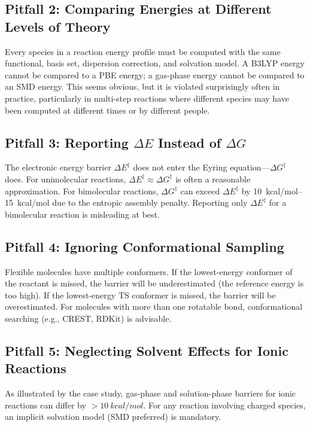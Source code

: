\documentclass[11pt]{article}
\numberwithin{equation}{section}
\begin{document}
\subsection{Pitfall 2: Comparing Energies at Different Levels of Theory}

Every species in a reaction energy profile must be computed with the same functional, basis set, dispersion correction, and solvation model. A B3LYP energy cannot be compared to a PBE energy; a gas-phase energy cannot be compared to an SMD energy. This seems obvious, but it is violated surprisingly often in practice, particularly in multi-step reactions where different species may have been computed at different times or by different people.

\subsection{Pitfall 3: Reporting $\Delta E$ Instead of $\Delta G$}

The electronic energy barrier $\Delta E^\ddagger$ does not enter the Eyring equation---$\Delta G^\ddagger$ does. For unimolecular reactions, $\Delta E^\ddagger \approx \Delta G^\ddagger$ is often a reasonable approximation. For bimolecular reactions, $\Delta G^\ddagger$ can exceed $\Delta E^\ddagger$ by \SIrange{10}{15}{kcal/mol} due to the entropic assembly penalty. Reporting only $\Delta E^\ddagger$ for a bimolecular reaction is misleading at best.

\subsection{Pitfall 4: Ignoring Conformational Sampling}

Flexible molecules have multiple conformers. If the lowest-energy conformer of the reactant is missed, the barrier will be underestimated (the reference energy is too high). If the lowest-energy TS conformer is missed, the barrier will be overestimated. For molecules with more than one rotatable bond, conformational searching (e.g., CREST, RDKit) is advisable.

\subsection{Pitfall 5: Neglecting Solvent Effects for Ionic Reactions}

As illustrated by the  case study, gas-phase and solution-phase barriers for ionic reactions can differ by ${>}\SI{10}{kcal/mol}$. For any reaction involving charged species, an implicit solvation model (SMD preferred) is mandatory.
\end{document}
